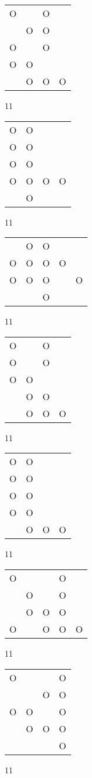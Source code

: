 \begin{tabular}{|m{0.2cm}m{0.2cm}m{0.2cm}m{0.2cm}|}\hline
O& &O& \\
 &O&O& \\
O& &O& \\
O&O& & \\
 &O&O&O\\
\hline\end{tabular}11
\begin{tabular}{|m{0.2cm}m{0.2cm}m{0.2cm}m{0.2cm}|}\hline
O&O& & \\
O&O& & \\
O&O& & \\
O&O&O&O\\
 &O& & \\
\hline\end{tabular}11
\begin{tabular}{|m{0.2cm}m{0.2cm}m{0.2cm}m{0.2cm}m{0.2cm}|}\hline
 &O&O& & \\
O&O&O&O& \\
O&O&O& &O\\
 & &O& & \\
\hline\end{tabular}11
\begin{tabular}{|m{0.2cm}m{0.2cm}m{0.2cm}m{0.2cm}|}\hline
O& &O& \\
O& &O& \\
O&O& & \\
 &O&O& \\
 &O&O&O\\
\hline\end{tabular}11
\begin{tabular}{|m{0.2cm}m{0.2cm}m{0.2cm}m{0.2cm}|}\hline
O&O& & \\
O&O& & \\
O&O& & \\
O&O& & \\
 &O&O&O\\
\hline\end{tabular}11
\begin{tabular}{|m{0.2cm}m{0.2cm}m{0.2cm}m{0.2cm}m{0.2cm}|}\hline
O& & &O& \\
 &O& &O& \\
 &O&O&O& \\
O& &O&O&O\\
\hline\end{tabular}11
\begin{tabular}{|m{0.2cm}m{0.2cm}m{0.2cm}m{0.2cm}|}\hline
O& & &O\\
 & &O&O\\
O&O& &O\\
 &O&O&O\\
 & & &O\\
\hline\end{tabular}11
